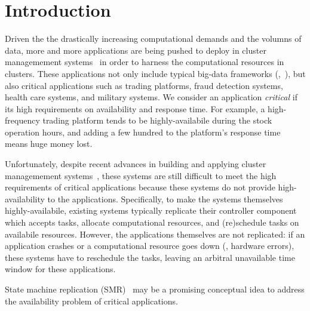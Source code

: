 \section{Introduction} \label{sec:intro}

Driven the the drastically increasing computational demands and the volumns of 
data, more and more applications are being pushed to deploy in cluster 
managemement systems~\cite{mesos,borg,helix,yarn} in order to harness the 
computational resources in clusters. These applications not only include typical 
big-data frameworks (\eg,~\cite{spark}), but also critical applications such as 
trading platforms, fraud detection systems, health care systems, and military 
systems. We consider an application \emph{critical} if its high requirements on 
availability and response time. For example, a high-frequency trading platform 
tends to be highly-availabile during the stock operation hours, and adding a 
few hundred \us to the platform's response time means huge money lost.

Unfortunately, despite recent advances in building and applying cluster 
managemement systems~\cite{mesos,borg,helix,yarn}, these systems are still 
difficult to meet the high requirements of critical applications because these 
systems do not provide high-availability to the applications. Specifically, to 
make the systems themselves highly-availabile, existing systems typically 
replicate their controller component which accepts tasks, allocate 
computational resources, and (re)schedule tasks on availabile resources. 
However, the applications themselves are not replicated: if an application 
crashes or a computational resource goes down (\eg, hardware errors), these 
systems have to reschedule the tasks, leaving an arbitral unavailable time 
window for these applications.

State machine replication (SMR)~\cite{paxos} may be a promising conceptual idea 
to address the availability problem of critical applications.




